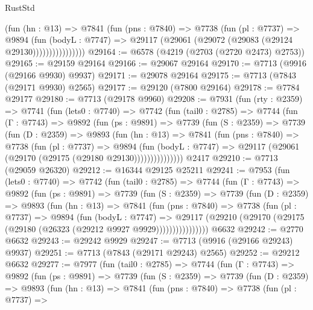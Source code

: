\begin{lexlean}{RustStd}
\begin{coremodule}
                    (fun (hn : @13) =>
                    @7841
                      (fun (pns : @7840) =>
                      @7738
                        (fun (pl : @7737) =>
                        @9894
                          (fun (bodyL : @7747) =>
                          @29117 (@29061 (@29072 (@29083 (@29124 @29130))))))))))))))))
@29164 := @6578 (@4219 (@2703 (@2720 @2473) @2753))
@29165 := @29159 @29164
@29166 := @29067 @29164
@29170 := @7713 (@9916 (@29166 @9930) @9937)
@29171 := @29078 @29164
@29175 := @7713 (@7843 (@29171 @9930) @2565)
@29177 := @29120 (@7800 @29164)
@29178 := @7784 @29177
@29180 := @7713 (@29178 @9960)
@29208 := @7931
    (fun (rty : @2359) =>
    @7741
      (fun (lets0 : @7740) =>
      @7742
        (fun (tail0 : @2785) =>
        @7744
          (fun (Γ : @7743) =>
          @9892
            (fun (ps : @9891) =>
            @7739
              (fun (S : @2359) =>
              @7739
                (fun (D : @2359) =>
                @9893
                  (fun (hn : @13) =>
                  @7841
                    (fun (pns : @7840) =>
                    @7738
                      (fun (pl : @7737) =>
                      @9894
                        (fun (bodyL : @7747) =>
                        @29117 (@29061 (@29170 (@29175 (@29180 @29130)))))))))))))))
    @2417
@29210 := @7713 (@29059 @26320)
@29212 := @16344 @29125 @25211
@29241 := @7953
    (fun (lets0 : @7740) =>
    @7742
      (fun (tail0 : @2785) =>
      @7744
        (fun (Γ : @7743) =>
        @9892
          (fun (ps : @9891) =>
          @7739
            (fun (S : @2359) =>
            @7739
              (fun (D : @2359) =>
              @9893
                (fun (hn : @13) =>
                @7841
                  (fun (pns : @7840) =>
                  @7738
                    (fun (pl : @7737) =>
                    @9894
                      (fun (bodyL : @7747) =>
                      @29117
                        (@29210 (@29170 (@29175 (@29180 (@26323 (@29212 @9927 @9929))))))))))))))))
    @6632
@29242 := @2770 @6632
@29243 := @29242 @9929
@29247 := @7713 (@9916 (@29166 @29243) @9937)
@29251 := @7713 (@7843 (@29171 @29243) @2565)
@29252 := @29212 @6632
@29277 := @7977
    (fun (tail0 : @2785) =>
    @7744
      (fun (Γ : @7743) =>
      @9892
        (fun (ps : @9891) =>
        @7739
          (fun (S : @2359) =>
          @7739
            (fun (D : @2359) =>
            @9893
              (fun (hn : @13) =>
              @7841
                (fun (pns : @7840) =>
                @7738
                  (fun (pl : @7737) =>

\end{coremodule}
\end{lexlean}
